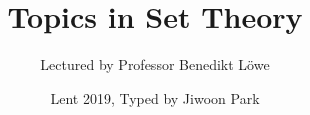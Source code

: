 \documentclass[12pt,a4paper]{article}
\newcommand{\latinmodern}[1]{{\fontfamily{lmss}\selectfont
\textbf{#1}
}}
\DeclarePairedDelimiter\bignorm{\lVert}{\rVert}
\newcommand{\doublerule}[1][.4pt]{%
  \noindent
  \makebox[0pt][l]{\rule[.7ex]{\linewidth}{#1}}%
  \rule[.3ex]{\linewidth}{#1}}
\begin{document}
\title{Topics in Set Theory}
\author{Lectured by Professor Benedikt Löwe}
\date{Lent 2019, Typed by Jiwoon Park}

\maketitle

\newcommand{\statement}[1]{\latinmodern{\textbf{#1) }}}

\newcommand{\thm}{\statement{Theorem}}
\newcommand{\thmnum}[1]{\statement{Theorem #1}}
\newcommand{\defi}{\statement{Definition}}
\newcommand{\definum}[1]{\statement{Definition #1}}
\newcommand{\lem}{\statement{Lemma}}
\newcommand{\lemnum}[1]{\statement{Lemma #1}}
\newcommand{\prop}{\statement{Proposition}}
\newcommand{\propnum}[1]{\statement{Proposition #1}}
\newcommand{\corr}{\statement{Corollary}}
\newcommand{\corrnum}[1]{\statement{Corollary #1}}
\newcommand{\pf}{\textbf{proof) }}

\newcommand{\zfc}{\text{ZFC}}
\newcommand{\ch}{\text{CH}}
\newcommand{\cons}{\text{Cons}}
\newcommand{\proves}{\vdash}

\newcommand{\lap}{\triangle} %
\newcommand{\s}{\vspace{10pt}}
\newcommand{\reals}{\mathbb{R}}
\newcommand{\forces}{\mathrel{\raisebox{0pt}{\scalebox{1}[1]{$|$}}\mkern-4.0mu\raisebox{0pt}{$-$}\mkern-12.5mu\raisebox{0pt}{\scalebox{1}[1]{$|$}}\mkern-5.0mu\raisebox{0pt}{$-$}}} %

\newcommand{\call}[1]{\quad \cdots\cdots\cdots\,\,(#1)}

\newcommand{\charac}{\mathrel{\raisebox{0pt}{\scalebox{1}[1]{$1$}} \mkern-5.5mu \raisebox{0.02pt}{\scalebox{1}[1]{$\_$}} \mkern-5.5mu\raisebox{2.25pt}{\scalebox{1}[0.66]{$\bm{|}$}} }}

\newcommand{\eop}{\hfill  \textsl{(End of proof)} $\square$} %
\newcommand{\eos}{\hfill  \textsl{(End of statement)} $\square$} %

\newcommand{\norms}[2]{\bignorm[\big]{#1}_{#2}}
\newcommand{\poset}{\mathbb{P}}

\newcommand{\borel}{\mathscr{B}}
\newcommand{\EE}{\mathscr{E}}
\newcommand{\pa}{\partial}

\renewcommand{\vec}{\underline}
\renewcommand{\bar}{\overline}

\def\doubleunderline#1{\underline{\underline{#1}}}

\newcommand{\newday}{\doublerule[0.5pt]}
\newcommand{\digression}{**********************************************************************************************}
\end{document}
